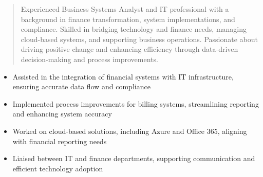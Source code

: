 



\makecvheader

\begin{quote}
  \noindent
  Experienced Business Systems Analyst and IT professional with a background in finance transformation, system implementations, and compliance. Skilled in bridging technology and finance needs, managing cloud-based systems, and supporting business operations. Passionate about driving positive change and enhancing efficiency through data-driven decision-making and process improvements.
\end{quote}

\par\smallskip
\noindent
\begin{minipage}{20cm}
  \begin{minipage}{9.75cm}
    \begin{itemize}
      \item Assisted in the integration of financial systems with IT infrastructure, ensuring accurate data flow and compliance
      \item Implemented process improvements for billing systems, streamlining reporting and enhancing system accuracy
    \end{itemize}
  \end{minipage}
  \hfill
  \begin{minipage}{9.75cm}
    \begin{itemize}
      \item Worked on cloud-based solutions, including Azure and Office 365, aligning with financial reporting needs
      \item Liaised between IT and finance departments, supporting communication and efficient technology adoption
    \end{itemize}
  \end{minipage}
\end{minipage}
\par\smallskip
\divider

